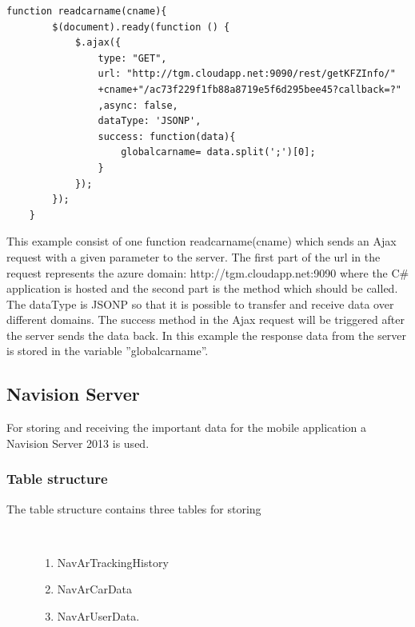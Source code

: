 \begin{lstlisting}[language=html, caption=readcarname example,captionpos=b]
function readcarname(cname){
        $(document).ready(function () {
            $.ajax({
                type: "GET",
                url: "http://tgm.cloudapp.net:9090/rest/getKFZInfo/"
                +cname+"/ac73f229f1fb88a8719e5f6d295bee45?callback=?"
                ,async: false,
                dataType: 'JSONP',
                success: function(data){
                    globalcarname= data.split(';')[0];
                }
            });
        });
    }
\end{lstlisting}
This example consist of one function readcarname(cname) which sends an Ajax request with a given parameter to the server. The first part of the url in the request represents the azure domain: http://tgm.cloudapp.net:9090 where the C\# application is hosted and the second part is the method which should be called. The dataType is JSONP so that it is possible to transfer and receive data over different domains. The success method in the Ajax request will be triggered after the server sends the data back. In this example the response data from the server is stored in the variable ''globalcarname''.
\newpage
\subsection{Navision Server}
For storing and receiving the important data for the mobile application a Navision Server 2013 is used.
\subsubsection{Table structure}
\begin{description}
   \item[The table structure contains three tables for storing]~\par
   \begin{enumerate}
      \item NavArTrackingHistory 
      \item NavArCarData
      \item	NavArUserData. 
   \end{enumerate}
\end{description}

